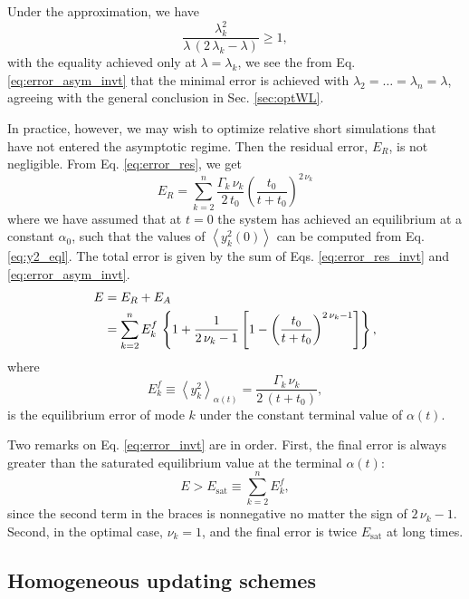 \documentclass[reprint]{revtex4-1}
\newcommand{\Err}{E}
\begin{document}
Under the approximation, we have
$$
\frac{ \lambda_k^2 }{ \lambda \, (2 \, \lambda_k - \lambda) } \ge 1,
$$
with the equality achieved only at $\lambda = \lambda_k$,
we see the from Eq. \eqref{eq:error_asym_invt}
that the minimal error is achieved with
$\lambda_2 = \dots = \lambda_n = \lambda$,
agreeing with the general conclusion
in Sec. \ref{sec:optWL}.



In practice, however, we may wish to optimize
relative short simulations that have not entered
the asymptotic regime.
%
Then the residual error, $\Err_R$, is not negligible.
%
From Eq. \eqref{eq:error_res}, we get
%
\begin{equation}
\Err_R
=
\sum_{k = 2}^n
  \frac{ \Gamma_k \, \nu_k }
       {        2 \, t_0   }
  \left(
      \frac{   t_0   }
           { t + t_0 }
   \right)^{ 2 \, \nu_k }
\label{eq:error_res_invt}
\end{equation}
%
where we have assumed that at $t = 0$
the system has achieved an equilibrium
at a constant $\alpha_0$,
such that the values of
$\left\langle y_k^2(0) \right\rangle$
can be computed from Eq. \eqref{eq:y2_eql}.
%
The total error is given by the sum of
Eqs. \eqref{eq:error_res_invt} and \eqref{eq:error_asym_invt}.
%
\begin{align}
\Err
&=
\Err_R + \Err_A
\notag
\\
&=
\sum_{ k = 2 }^n
  E^f_k \,
  \left\{
    1
    +
    \frac{ 1 } { 2 \, \nu_k - 1 }
    \left[
      1 -
      \left(
        \frac{   t_0   }
             { t + t_0 }
      \right)^{2 \, \nu_k - 1}
    \right]
  \right\}
,
\label{eq:error_invt}
\end{align}
%
where
$$
E^f_k
\equiv
\left\langle
  y_k^2
\right\rangle_{ \alpha(t) }
=
\frac{  \Gamma_k \, \nu_k   }
     {  2 \, (t + t_0)      }
,
$$
is the equilibrium error of mode $k$
under the constant terminal value
of $\alpha(t)$.


Two remarks on Eq. \eqref{eq:error_invt} are in order.
%
First, the final error is always greater than
the saturated equilibrium value at the terminal $\alpha(t)$:
$$
E > E_\mathrm{sat} \equiv \sum_{k = 2}^n E^f_k,
$$
since the second term in the braces
is nonnegative no matter the sign of $2 \, \nu_k - 1$.
%
Second, in the optimal case,
$\nu_k = 1$,
and the final error is twice $E_\mathrm{sat}$
at long times.





\subsection{\label{sec:band-matrix}
Homogeneous updating schemes}
\end{document}
